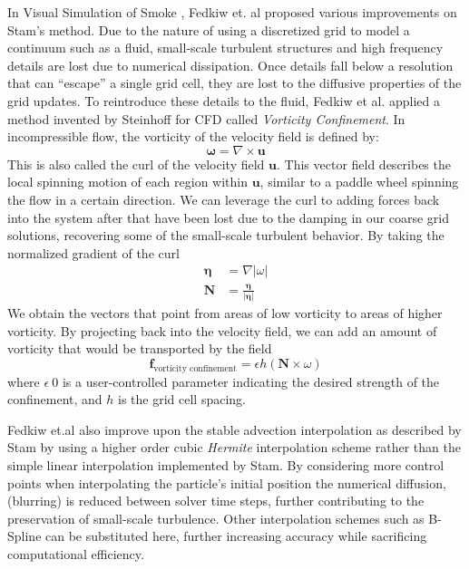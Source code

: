 \documentclass[a4paper, 11pt, titlepage]{article}
\renewcommand\i[1]{\textit{#1}}%
\begin{document}
In Visual Simulation of Smoke \cite{fedkiw2001visual}, Fedkiw et. al proposed various
improvements on Stam's method. Due to the nature of using a discretized grid to
model a continuum such as a fluid, small-scale turbulent structures and high
frequency details are lost due to numerical dissipation. Once details fall below
a resolution that can ``escape'' a single grid cell, they are lost to the
diffusive properties of the grid updates. To reintroduce these details to the
fluid, Fedkiw et al. applied a method invented by Steinhoff \cite{steinhoff1994modification} for CFD called
\i{Vorticity Confinement}. In incompressible flow, the vorticity of the velocity
field is defined by:
$$
    \bm{\omega} = \nabla \times \bm{u}
$$
This is also called the curl of the velocity field $\bm{u}$. This vector field
describes the local spinning motion of each region within $\bm{u}$, similar to a
paddle wheel spinning the flow in a certain direction. We can leverage the curl
to adding forces back into the system after that have been lost due to the
damping in our coarse grid solutions, recovering some of the
small-scale turbulent behavior. By taking the normalized gradient of the curl
\begin{equation}
\begin{aligned}
    \bm{\eta} &= \nabla \vert\omega\vert \\
    \bm{N} &= \frac{\bm{\eta}}{\vert \bm{\eta} \vert}
\end{aligned}
\end{equation}
We obtain the vectors that point from areas of low vorticity to areas of higher
vorticity. By projecting back into the velocity field, we can add an amount of
vorticity that would be transported by the field
\begin{equation}
    \bm{f}_\text{vorticity confinement} = \epsilon h (\bm{N} \times \omega)
\end{equation}
where $\epsilon \> 0$ is a user-controlled parameter indicating the desired strength of
the confinement, and $h$ is the grid cell spacing.

Fedkiw et.al also improve upon the stable advection interpolation as described
by Stam by using a higher order cubic \i{Hermite} interpolation scheme rather
than the simple linear interpolation implemented by Stam. By considering more
control points when interpolating the particle's initial position the numerical
diffusion, (blurring) is reduced between solver time steps, further contributing
to the preservation of small-scale turbulence. Other interpolation schemes such
as B-Spline \cite{he2011real} can be substituted here, further increasing accuracy while
sacrificing computational efficiency.
\end{document}

